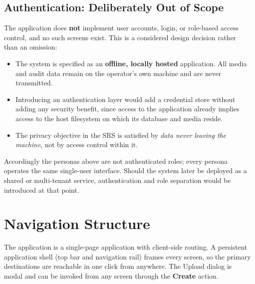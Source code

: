 \documentclass[12pt,a4paper,twoside]{article}
\begin{document}
\subsection{Authentication: Deliberately Out of Scope}

The application does \textbf{not} implement user accounts, login, or role-based access
control, and no such screens exist. This is a considered design decision rather than an
omission:

\begin{itemize}[nosep]
\item The system is specified as an \textbf{offline, locally hosted} application. All
media and audit data remain on the operator's own machine and are never transmitted.
\item Introducing an authentication layer would add a credential store without adding
any security benefit, since access to the application already implies access to the
host filesystem on which its database and media reside.
\item The privacy objective in the SRS is satisfied by \emph{data never leaving the
machine}, not by access control within it.
\end{itemize}

Accordingly the personas above are not authenticated roles; every persona operates the
same single-user interface. Should the system later be deployed as a shared or
multi-tenant service, authentication and role separation would be introduced at that
point.

\section{Navigation Structure}

The application is a single-page application with client-side routing. A persistent
application shell (top bar and navigation rail) frames every screen, so the primary
destinations are reachable in one click from anywhere. The Upload dialog is modal and
can be invoked from any screen through the \textbf{Create} action.
\end{document}

